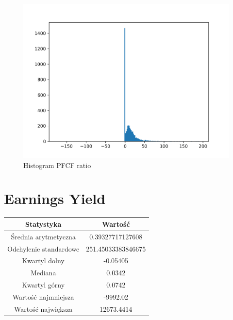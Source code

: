 \documentclass{article}
\begin{document}
\begin{figure}[h!]
    \includegraphics[width=\linewidth]{variables/PFCF ratio.png}
    \caption{Histogram PFCF ratio }
\end{figure}\section{ Earnings Yield }

\begin{center}
    \begin{tabular}{|c | c|} 
    \hline
    Statystyka & Wartość \\
    \hline\hline
    Średnia arytmetyczna & 0.39327717127608 \\ 
    \hline
    Odchylenie standardowe & 251.45033383846675 \\
    \hline
    Kwartyl dolny & -0.05405 \\
    \hline
    Mediana & 0.0342 \\
    \hline
    Kwartyl górny & 0.0742 \\
    \hline
    Wartość najmniejsza & -9992.02 \\
    \hline
    Wartość największa & 12673.4414 \\
    \hline
   \end{tabular}
\end{center}
\end{document}
